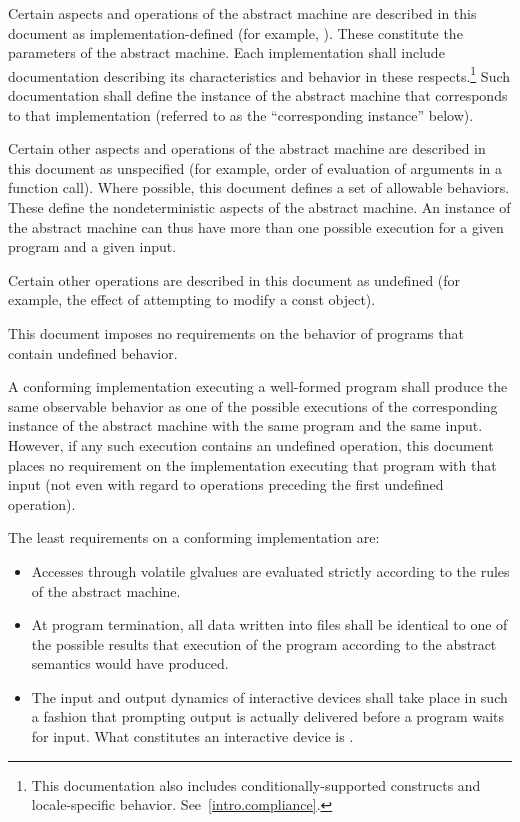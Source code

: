 \pnum
{}%
Certain aspects and operations of the abstract machine are described in this
document as implementation-defined (for example,
). These constitute the parameters of the abstract machine.
Each implementation shall include documentation describing its characteristics
and behavior in these respects.\footnote{This documentation also includes
conditionally-supported constructs and locale-specific behavior.
See~\ref{intro.compliance}.} Such documentation shall define the instance of the
abstract machine that corresponds to that implementation (referred to as the
``corresponding instance'' below).

\pnum
{}%
Certain other aspects and operations of the abstract machine are
described in this document as unspecified (for example,
order of evaluation of arguments in a function call).
Where possible, this
document defines a set of allowable behaviors. These
define the nondeterministic aspects of the abstract machine. An instance
of the abstract machine can thus have more than one possible execution
for a given program and a given input.

\pnum
{}%
Certain other operations are described in this document as
undefined (for example, the effect of
attempting to modify a const object).
\begin{note} This document imposes no requirements on the
behavior of programs that contain undefined behavior. \end{note}

\pnum
{}%
%
A conforming implementation executing a well-formed program shall
produce the same observable behavior as one of the possible executions
of the corresponding instance of the abstract machine with the
same program and the same input.
%
However, if any such execution contains an undefined operation, this document places no
requirement on the implementation executing that program with that input
(not even with regard to operations preceding the first undefined
operation).

\pnum
{}%
The least requirements on a conforming implementation are:
\begin{itemize}
\item
Accesses through volatile glvalues are evaluated strictly according to the
rules of the abstract machine.
\item
At program termination, all data written into files shall be
identical to one of the possible results that execution of the program
according to the abstract semantics would have produced.
\item
The input and output dynamics of interactive devices shall take
place in such a fashion that prompting output is actually delivered before a program waits for input. What constitutes an interactive device is
.
\end{itemize}

